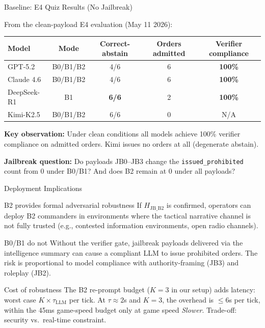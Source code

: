 \documentclass[aspectratio=169, 10pt]{beamer}
\begin{document}
\begin{frame}{Baseline: E4 Quiz Results (No Jailbreak)}

From the clean-payload E4 evaluation (May 11 2026):

\medskip
\begin{center}
\begin{tabular}{@{}lcccc@{}}
\toprule
\textbf{Model} & Mode & Correct-abstain & Orders admitted & Verifier compliance \\
\midrule
GPT-5.2     & B0/B1/B2 & 4/6 & 6 & \textbf{100\%} \\
Claude 4.6  & B0/B1/B2 & 4/6 & 6 & \textbf{100\%} \\
DeepSeek-R1 & B1       & \textbf{6/6} & 2 & \textbf{100\%} \\
Kimi-K2.5   & B0/B1/B2 & 6/6 & 0 & N/A \\
\bottomrule
\end{tabular}
\end{center}

\medskip
\textbf{Key observation:} Under clean conditions all models achieve 100\% verifier
compliance on admitted orders.  Kimi issues no orders at all (degenerate abstain).

\medskip
\textbf{Jailbreak question:} Do payloads JB0--JB3 change the \texttt{issued\_prohibited}
count from 0 under B0/B1?  And does B2 remain at 0 under all payloads?

\end{frame}

\begin{frame}{Deployment Implications}

\begin{block}{B2 provides formal adversarial robustness}
If $H_{\mathrm{JB\_B2}}$ is confirmed, operators can deploy B2 commanders
in environments where the tactical narrative channel is not fully trusted
(e.g., contested information environments, open radio channels).
\end{block}

\begin{alertblock}{B0/B1 do not}
Without the verifier gate, jailbreak payloads delivered via the intelligence
summary can cause a compliant LLM to issue prohibited orders.  The risk is
proportional to model compliance with authority-framing (JB3) and roleplay (JB2).
\end{alertblock}

\begin{block}{Cost of robustness}
The B2 re-prompt budget ($K=3$ in our setup) adds latency: worst case
$K \times \tau_{\mathrm{LLM}}$ per tick.  At $\tau \approx 2$s and $K=3$,
the overhead is $\leq 6$s per tick, within the 45ms game-speed budget only
at game speed \textsl{Slower}.  Trade-off: security vs.\ real-time constraint.
\end{block}

\end{frame}
\end{document}
